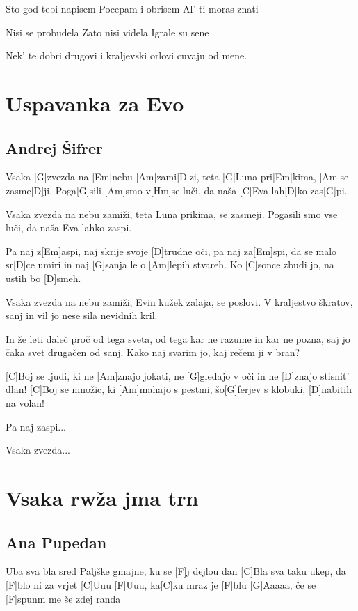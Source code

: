 \documentclass[a4paper,12pt]{article}
\begin{document}
\begin{multicols}{2}
\begin{guitar}
Sto god tebi napisem
Pocepam i obrisem
Al' ti moras znati


Nisi se probudela
Zato nisi videla
Igrale su sene


Nek' te dobri drugovi
i kraljevski orlovi
cuvaju od mene.

\end{guitar}
\section{Uspavanka za Evo}
\subsection*{Andrej Šifrer}
\begin{guitar}

Vsaka [G]zvezda na [Em]nebu [Am]zami[D]zi, 
teta [G]Luna pri[Em]kima, [Am]se zasme[D]ji. 
Poga[G]sili [Am]smo v[Hm]se luči, 
da naša [C]Eva lah[D]ko zas[G]pi. 


Vsaka zvezda na nebu zamiži, 
teta Luna prikima, se zasmeji. 
Pogasili smo vse luči, 
da naša Eva lahko zaspi. 


Pa naj z[Em]aspi, naj skrije svoje [D]trudne oči, 
pa naj za[Em]spi, da se malo sr[D]ce umiri 
in naj [G]sanja le o [Am]lepih stvareh. 
Ko [C]sonce zbudi jo, na ustih bo [D]smeh. 


Vsaka zvezda na nebu zamiži, 
Evin kužek zalaja, se poslovi. 
V kraljestvo škratov, sanj in vil 
jo nese sila nevidnih  kril. 


In že leti daleč proč od tega sveta, 
od tega kar ne razume in kar ne pozna, 
saj jo čaka svet drugačen od sanj. 
Kako naj svarim jo, kaj rečem ji v bran? 


[C]Boj se ljudi, ki ne [Am]znajo jokati, 
ne [G]gledajo v oči in ne [D]znajo stisnit’ dlan! 
[C]Boj se množic, ki [Am]mahajo s pestmi, 
šo[G]ferjev s klobuki, [D]nabitih na volan! 


Pa naj zaspi... 


Vsaka zvezda...

\end{guitar}
\section{Vsaka rwža jma trn}
\subsection*{Ana Pupedan}
\begin{guitar}
[C]Uba sva bla sred Paljške gmajne, 
ku se [F]j dejlou dan
[C]Bla sva taku ukep, da [F]blo ni za vrjet
[C]Uuu [F]Uuu, ka[C]ku mraz je [F]blu
[G]Aaaaa, če se [F]spunm me še zdej randa



\end{guitar}
\end{multicols}
\end{document}
